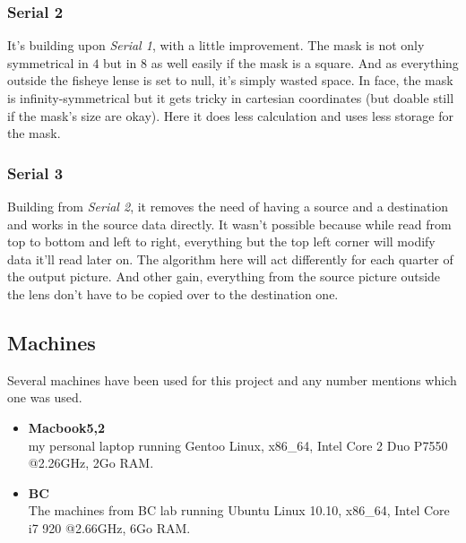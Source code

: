 \documentclass[10pt,a4paper]{article}
\begin{document}
\subsubsection{Serial 2}

It’s building upon \emph{Serial 1}, with a little improvement. The mask is not
only symmetrical in $4$ but in $8$ as well easily if the mask is a square. And
as everything outside the fisheye lense is set to null, it’s simply wasted
space. In face, the mask is infinity-symmetrical but it gets tricky in
cartesian coordinates (but doable still if the mask’s size are okay). Here it
does less calculation and uses less storage for the mask.

\subsubsection{Serial 3}

Building from \emph{Serial 2}, it removes the need of having a source and a
destination and works in the source data directly. It wasn’t possible because
while read from top to bottom and left to right, everything but the top left
corner will modify data it’ll read later on. The algorithm here will act
differently for each quarter of the output picture. And other gain, everything
from the source picture outside the lens don’t have to be copied over to the
destination one.

\subsection{Machines}

Several machines have been used for this project and any number mentions which
one was used.

\begin{itemize}
    \item \textbf{Macbook5,2}\\
    my personal laptop running Gentoo Linux, x86\_64, Intel Core 2 Duo P7550
    @2.26GHz, 2Go RAM.
    
    \item \textbf{BC}\\
    The machines from BC lab running Ubuntu Linux 10.10, x86\_64, Intel Core i7
    920 @2.66GHz, 6Go RAM.

\end{itemize}

%
%
\end{document}
